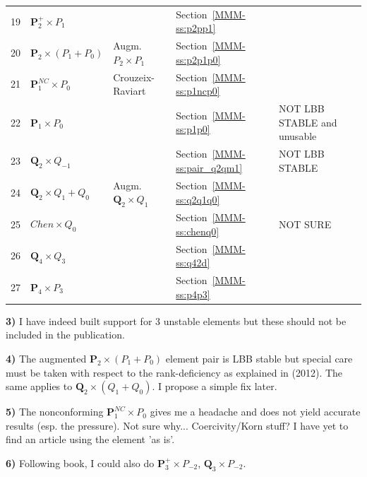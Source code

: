 \begin{center}
\begin{tabular}{p{1cm}p{2.75cm}p{3.5cm}p{2.25cm}p{6cm}}
19&${\bm P}_2^+\times P_{1}$   &                             & Section~\ref{MMM-ss:p2pp1}\\
20&${\bm P}_2\times (P_1+P_0)$ & Augm. $P_2\times P_1$       & Section~\ref{MMM-ss:p2p1p0}\\
21&${\bm P}_1^{NC}\times P_0$  & Crouzeix-Raviart            & Section~\ref{MMM-ss:p1ncp0}\\
22&${\bm P}_1\times P_0$       &                             & Section~\ref{MMM-ss:p1p0}  &NOT LBB STABLE and unusable\\
23&${\bm Q}_2\times Q_{-1}$    &                             & Section~\ref{MMM-ss:pair_q2qm1} & NOT LBB STABLE\\
24&${\bm Q}_2\times Q_1+Q_0$   & Augm. ${\bm Q}_2\times Q_1$ & Section~\ref{MMM-ss:q2q1q0} \\
25&$Chen\times Q_0$            &                             & Section~\ref{MMM-ss:chenq0} & NOT SURE \\
26&${\bm Q}_4\times Q_3$       &                             & Section~\ref{MMM-ss:q42d}\\
27&${\bm P}_4\times P_3$       &                             & Section~\ref{MMM-ss:p4p3}\\
\hline
\end{tabular}
\end{center}

\begin{remark}
{\bf 3)} I have indeed built support for 3 unstable elements but 
these should not be included in the publication. 
\end{remark}

\begin{remark}
{\bf 4)} The augmented ${\bm P}_2\times (P_1+P_0)$ element pair is LBB stable 
but special care must be taken with respect to the rank-deficiency 
as explained in \textcite{bocg12} (2012). The same applies to ${\bm Q}_2\times (Q_1+Q_0)$. 
I propose a simple fix later. 
\end{remark}

\begin{remark}
{\bf 5)} The nonconforming ${\bm P}_1^{NC}\times P_0$ gives me a headache and does not 
yield accurate results (esp. the pressure). Not sure why... Coercivity/Korn stuff? I
have yet to find an article using the element 'as is'.
\end{remark}

\begin{remark}
{\bf 6)} Following \textcite{john16} book, I could also do 
${\bm P}_3^+\times P_{-2}$, ${\bm Q}_3\times P_{-2}$. 
\end{remark}

